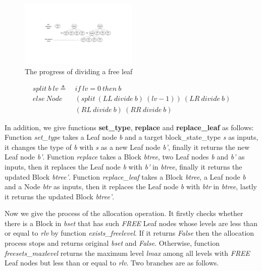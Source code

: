 \begin{figure}[htbp]
	\centering
	\includegraphics[width=0.5\textwidth]{fig1.pdf}
	\caption{The progress of dividing a free leaf}
	\label{fig1}
\end{figure}

\begin{definition} 
\end{definition}
\vspace{-7pt}
{\footnotesize
\begin{align*}
split\ b\ lv \triangleq\ &if\ lv = 0\ then\ b \\
else\ Node\ &(split\ (LL\ divide\ b)\ (lv - 1))\ (LR\ divide\ b)\\ 
&(RL\ divide\ b)\ (RR\ divide\ b)
\end{align*}
}	
\vspace{-12pt}

In addition, we give functions \textbf{set\_type}, \textbf{replace} and \textbf{replace\_leaf} as follows: Function \emph{set\_type} takes a Leaf node \emph{b} and a target block\_state\_type \emph{s} as inputs, it changes the type of \emph{b} with \emph{s} as a new Leaf node \emph{b'}, finally it returns the new Leaf node \emph{b'}. Function \emph{replace} takes a Block \emph{btree}, two Leaf nodes \emph{b} and \emph{b'} as inputs, then it replaces the Leaf node \emph{b} with \emph{b'} in \emph{btree}, finally it returns the updated Block \emph{btree'}. Function \emph{replace\_leaf} takes a Block \emph{btree}, a Leaf node \emph{b} and a Node \emph{btr} as inputs, then it replaces the Leaf node \emph{b} with \emph{btr} in \emph{btree}, lastly it returns the updated Block \emph{btree'}.

Now we give the process of the allocation operation. It firstly checks whether there is a Block in \emph{bset} that has such \emph{FREE} Leaf nodes whose levels are less than or equal to \emph{rlv} by function \emph{exists\_freelevel}. If it returns \emph{False} then the allocation process stops and returns original \emph{bset} and \emph{False}. Otherwise, function \emph{freesets\_maxlevel} returns the maximum level \emph{lmax} among all levels with \emph{FREE} Leaf nodes but less than or equal to \emph{rlv}. Two branches are as follows.

